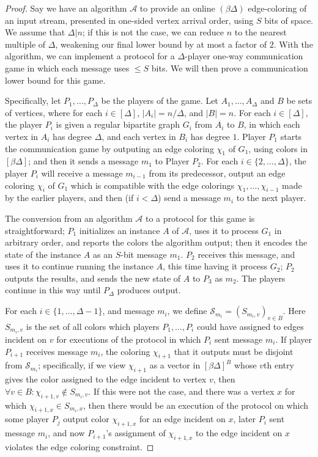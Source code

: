 \documentclass[10pt]{article}
\theoremstyle{definition}\newtheorem{definition}[lemma]{Definition}
\theoremstyle{remark}  \newtheorem*{remark}{Remark}
\newcommand{\cA}{\mathcal{A}}
\newcommand{\cS}{\mathcal{S}}
\begin{document}
\begin{proof} Say we have an algorithm $\cA$ to provide an online $(\beta \Delta)$ edge-coloring of an input stream, presented in one-sided vertex arrival order, using $S$ bits of space. We assume
  that $\Delta | n$; if this is not the case, we can reduce $n$ to the nearest multiple
  of $\Delta$, weakening our final lower bound by at most a factor of $2$.
  With the algorithm, we can implement a protocol for a $\Delta$-player one-way
  communication game in which each message uses $\le S$ bits. We will then prove a communication lower bound
  for this game.
  
  Specifically, let $P_1,\ldots,P_\Delta$ be the players of the game. Let $A_1,\ldots,A_\Delta$ and $B$ be sets of vertices, where for each $i\in[\Delta]$,
  $|A_i| = n/\Delta$, and $|B| = n$. For each $i\in[\Delta]$, the player $P_i$ is given a regular bipartite graph $G_i$ from $A_i$ to $B$, in which each vertex in $A_i$ has degree $\Delta$, and each vertex in $B_i$ has degree $1$. Player $P_1$ starts the communication game by
  outputing an edge coloring $\chi_1$ of $G_1$, using colors in $[\beta \Delta]$; and
  then it sends a message $m_1$ to Player $P_2$. For each $i \in \{2,\ldots,\Delta\}$,
  the player $P_i$ will receive a message $m_{i-1}$ from its predecessor, output an edge
  coloring $\chi_i$ of $G_1$ which is compatible with the edge colorings $\chi_1,\ldots,\chi_{i-1}$ made by the earlier players, and then (if $i < \Delta$) send a message $m_i$
  to the next player.
  
  The conversion from an algorithm $\cA$ to a protocol for this game is straightforward;
  $P_1$ initializes an instance $A$ of $\cA$, uses it to process $G_1$ in arbitrary order, and reports the colors the algorithm output; then it encodes the state of the instance $A$ as an $S$-bit
  message $m_1$. $P_2$ receives this message, and uses it to continue running the instance
  $A$, this time having it process $G_2$; $P_2$ outputs the results, and sends the new state
  of $A$ to $P_3$ as $m_2$. The players continue in this way until $P_\Delta$ produces output.
  
  For each $i \in \{1,\ldots,\Delta-1\}$, and message $m_i$, we define $\cS_{m_i} = (S_{m_i,v})_{v \in B}$. Here $S_{m_i,v}$ is the set of all colors which players $P_1,\ldots,P_i$ could 
  have assigned to edges incident on $v$ for executions of the protocol in which $P_i$ sent message $m_i$. If player $P_{i+1}$ receives message $m_i$, the coloring $\chi_{i+1}$ that it
  outputs must be disjoint from $\cS_{m_i}$; specifically, if we view $\chi_{i+1}$ as a vector
  in $[\beta \Delta]^B$ whose $v$th entry gives the color assigned to the edge incident to vertex $v$, then $\forall v \in B : \chi_{i+1, v} \notin S_{m_i,v}$. If this were not the case, and
  there was a vertex $x$ for which $\chi_{i+1, x} \in S_{m_i,x}$, then there would be an execution of the protocol on which some player $P_j$ output color $\chi_{i+1, x}$ for 
  an edge incident on $x$, later $P_i$ sent message $m_i$, and now $P_{i+1}$'s assignment of
  $\chi_{i+1, x}$ to the edge incident on $x$ violates the edge coloring constraint.
  

\end{proof}
\end{document}
